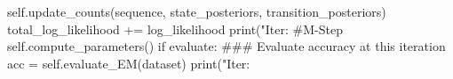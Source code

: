 \begin{exercise}
\begin{python}
                self.update_counts(sequence, state_posteriors, transition_posteriors)
                total_log_likelihood += log_likelihood
            print("Iter: %
            #M-Step
            self.compute_parameters()
            if evaluate:
                 ### Evaluate accuracy at this iteration
                acc = self.evaluate_EM(dataset)
                print("Iter: %
\end{python}

\end{exercise}

